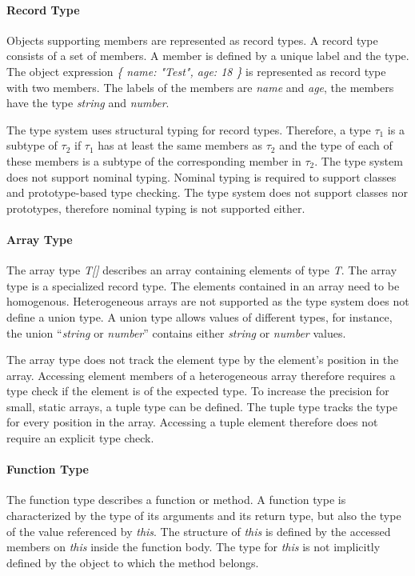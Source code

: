 \paragraph{Record Type}
Objects supporting members are represented as record types. A record type consists of a set of members. A member is defined by a unique label and the type. The object expression \textit{\{ name: "Test", age: 18 \}} is represented as record type with two members. The labels of the members are \textit{name} and \textit{age}, the members have the type \textit{string} and \textit{number}.  

The type system uses structural typing for record types. Therefore, a type $\tau_1$ is a subtype of $\tau_2$ if $\tau_1$ has at least the same members as $\tau_2$ and the type of each of these members is a subtype of the corresponding member in $\tau_2$. The type system does not support nominal typing. Nominal typing is required to support classes  and prototype-based type checking. The type system does not support classes nor prototypes, therefore nominal typing is not supported either. 

\paragraph{Array Type}
The array type \textit{T[]} describes an array containing elements of type \textit{T}. The array type is a specialized record type. The elements contained in an array need to be homogenous. Heterogeneous arrays are not supported as the type system does not define a union type. A union type allows values of different types, for instance, the union \enquote{\textit{string} or \textit{number}} contains either \textit{string} or \textit{number} values. 

The array type does not track the element type by the element's position in the array. Accessing element members of a heterogeneous array therefore requires a type check if the element is of the expected type. To increase the precision for small, static arrays, a tuple type can be defined. The tuple type tracks the type for every position in the array. Accessing a tuple element therefore does not require an explicit type check. 

\paragraph{Function Type}
The function type describes a function or method. A function type is characterized by the type of its arguments and its return type, but also the type of the value referenced by \textit{this}. The structure of \textit{this} is defined by the accessed members on \textit{this} inside the function body. The type for \textit{this} is not implicitly defined by the object to which the method belongs. 

